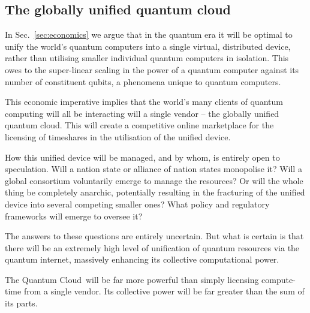 %
%

\subsection{The globally unified quantum cloud}

In Sec.~\ref{sec:economics} we argue that in the quantum era it will be optimal to unify the world's quantum computers into a single virtual, distributed device, rather than utilising smaller individual quantum computers in isolation. This owes to the super-linear scaling in the power of a quantum computer against its number of constituent qubits, a phenomena unique to quantum computers.

This economic imperative implies that the world's many clients of quantum computing will all be interacting will a single vendor -- the globally unified quantum cloud. This will create a competitive online marketplace for the licensing of timeshares in the utilisation of the unified device.

How this unified device will be managed, and by whom, is entirely open to speculation. Will a nation state or alliance of nation states monopolise it? Will a global consortium voluntarily emerge to manage the resources? Or will the whole thing be completely anarchic, potentially resulting in the fracturing of the unified device into several competing smaller ones? What policy and regulatory frameworks will emerge to oversee it? 

The answers to these questions are entirely uncertain. But what is certain is that there will be an extremely high level of unification of quantum resources via the quantum internet, massively enhancing its collective computational power.

The Quantum Cloud\texttrademark\, will be far more powerful than simply licensing compute-time from a single vendor. Its collective power will be far greater than the sum of its parts.